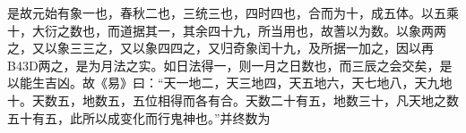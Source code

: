 \documentclass[]{article}
\begin{document}
是故元始有象一也，春秋二也，三统三也，四时四也，合而为十，成五体。以五乘十，大衍之数也，而道据其一，其余四十九，所当用也，故蓍以为数。以象两两之，又以象三三之，又以象四四之，又归奇象闰十九，及所据一加之，因以再B43D两之，是为月法之实。如日法得一，则一月之日数也，而三辰之会交矣，是以能生吉凶。故《易》曰：``天一地二，天三地四，天五地六，天七地八，天九地十。天数五，地数五，五位相得而各有合。天数二十有五，地数三十，凡天地之数五十有五，此所以成变化而行鬼神也。''并终数为
\end{document}
